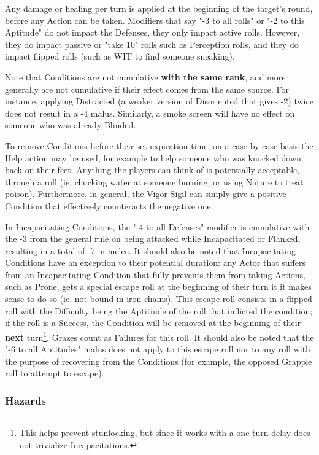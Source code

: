 Any damage or healing per turn is applied at the beginning of the target's round, before any Action can be taken. Modifiers that say "-3 to all rolls" or "-2 to this Aptitude" do not impact the Defenses, they only impact active rolls. However, they do impact passive or "take 10" rolls such as Perception rolls, and they do impact flipped rolls (such as WIT to find someone sneaking).

Note that Conditions are not cumulative \textbf{with the same rank}, and more generally are not cumulative if their effect comes from the same source. For instance, applying Distracted (a weaker version of Disoriented that gives -2) twice does not result in a -4 malus. Similarly, a smoke screen will have no effect on someone who was already Blinded.

To remove Conditions before their set expiration time, on a case by case basis the Help action may be used, for example to help someone who was knocked down back on their feet. Anything the players can think of is potentially acceptable, through a roll (ie. chucking water at someone burning, or using Nature to treat poison). Furthermore, in general, the Vigor Sigil can simply give a positive Condition that effectively counteracts the negative one.

In Incapacitating Conditions, the "-4 to all Defenses" modifier is cumulative with the -3 from the general rule on being attacked while Incapacitated or Flanked, resulting in a total of -7 in melee. It should also be noted that Incapacitating Conditions have an exception to their potential duration: any Actor that suffers from an Incapacitating Condition that fully prevents them from taking Actions, such as Prone, gets a special escape roll at the beginning of their turn it it makes sense to do so (ie. not bound in iron chains). This escape roll consists in a flipped roll with the Difficulty being the Aptitiude of the roll that inflicted the condition; if the roll is a Success, the Condition will be removed at the beginning of their \textbf{next} turn\footnote{This helps prevent stunlocking, but since it works with a one turn delay does not trivialize Incapacitations.}. Grazes count as Failures for this roll. It should also be noted that the "-6 to all Aptitudes" malus does not apply to this escape roll nor to any roll with the purpose of recovering from the Conditions (for example, the opposed Grapple roll to attempt to escape).


\subsubsection{Hazards}

